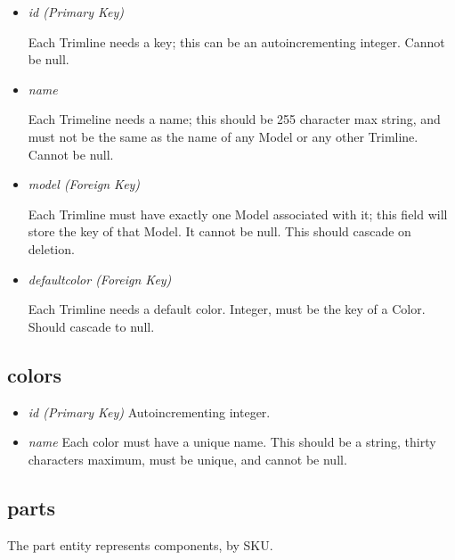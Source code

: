 \documentclass[11pt,letterpaper,oneside]{amsart}
\begin{document}
\begin{itemize}
	\item \emph{id (Primary Key)}
	
	Each Trimline needs a key; this can be an autoincrementing integer. Cannot be null.
	
	\item \emph{name}
	
	Each Trimeline needs a name; this should be 255 character max string, and must not be the same as the name of any Model or any other Trimline.  Cannot be null.

	\item \emph{model (Foreign Key)}
	
	Each Trimline must have exactly one Model associated with it; this field will store the key of that Model.  It cannot be null.  This should cascade on deletion.
	
	\item \emph{default{\textunderscore}color (Foreign Key)}
	
	Each Trimline needs a default color.  Integer, must be the key of a Color.  Should cascade to null.

\end{itemize}

\subsection*{colors}

\begin{itemize}
	\item \emph{id (Primary Key)}
		Autoincrementing integer.

	\item \emph	{name}
		Each color must have a unique name.  This should be a string, thirty characters maximum, must be unique, and cannot be null.
		
\end{itemize}

\subsection*{parts}

The part entity represents components, by SKU.
\end{document}
